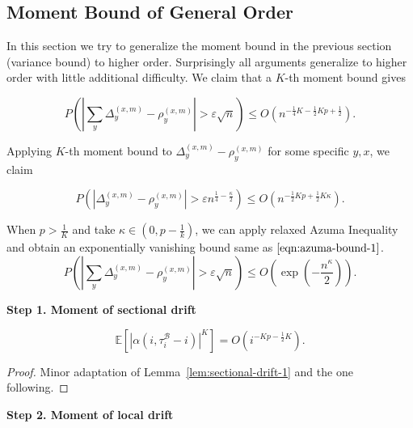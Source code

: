 
\subsection{Moment Bound of General Order}

In this section we try to generalize the moment bound in the previous section (variance bound) to higher order. Surprisingly all arguments generalize to higher order with little additional difficulty. We claim that a $K$-th moment bound gives

\begin{equation}
	P \left( \left| \sum_y \Delta_y^{(x,m)} - \rho_y^{(x,m)} \right| > \varepsilon \sqrt{n} \right) \le O\left( n^{-\frac{1}{4}K - \frac{1}{2} Kp + \frac{1}{2}} \right)
	\label{eqn:general-moment-bound}
.\end{equation} 

Applying $K$-th moment bound to $\Delta_y^{(x,m)} - \rho_y^{(x,m)}$ for some specific $y, x$, we claim

\[
	P\left( \left| \Delta_y^{(x,m)} - \rho_y^{(x,m)} \right| > \varepsilon n^{\frac{1}{4} - \frac{\kappa}{2}}  \right) \le  O\left( n^{-\frac{1}{2}K p + \frac{1}{2} K \kappa } \right)  
.\] 

When $p > \frac{1}{K}$ and take $\kappa \in (0,p - \frac{1}{k})$, we can apply relaxed Azuma Inequality and obtain an exponentially vanishing bound same as $\ref{eqn:azuma-bound-1}$.
 \[
	P \left( \left| \sum_y \Delta_y^{(x,m)} - \rho_y^{(x,m)} \right| > \varepsilon \sqrt{n} \right) 
	\le O\left( \exp\left( -\frac{ n^{\kappa}}{2}  \right)  \right) 
.\] 

\textbf{Step 1. Moment of sectional drift}

\begin{lemma}
	\[
		\mathbb{E}\left[ \left| \alpha(i, \tau_i^{\mathcal{B}} - i) \right| ^K \right] 
		= O\left(i^{-Kp - \frac{1}{2}K}\right)
	.\] 
\end{lemma}
\begin{proof}
	Minor adaptation of Lemma~\ref{lem:sectional-drift-1} and the one following.
\end{proof}

\textbf{Step 2. Moment of local drift}

